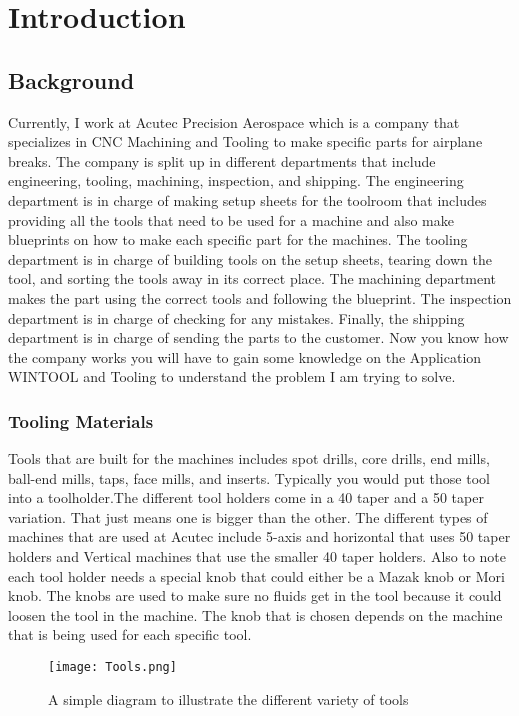 \chapter{Introduction}\label{sec:introduction}

\section{Background}

Currently, I work at Acutec Precision Aerospace which is a company that specializes in CNC Machining and Tooling to make specific parts for airplane breaks. The company is split up in different departments that include engineering, tooling, machining, inspection, and shipping. The engineering department is in charge of making setup sheets for the toolroom that includes providing all the tools that need to be used for a machine and also make blueprints on how to make each specific part for the machines. The tooling department is in charge of building tools on the setup sheets, tearing down the tool, and sorting the tools away in its correct place. The machining department makes the part using the correct tools and following the blueprint. The inspection department is in charge of checking for any mistakes. Finally, the shipping department is in charge of sending the parts to the customer. Now you know how the company works you will have to gain some knowledge on the Application WINTOOL and Tooling to understand the problem I am trying to solve.

\subsection{Tooling Materials}

Tools that are built for the machines includes spot drills, core drills, end mills, ball-end mills, taps, face mills, and inserts. Typically you would put those tool into a toolholder.The different tool holders come in a 40 taper and a 50 taper variation. That just means one is bigger than the other. The different types of machines that are used at Acutec include 5-axis and horizontal that uses 50 taper holders and Vertical machines that use the smaller 40 taper holders. Also to note each tool holder needs a special knob that could either be a Mazak knob or Mori knob. The knobs are used to make sure no fluids get in the tool because it could loosen the tool in the machine. The knob that is chosen depends on the machine that is being used for each specific tool.
\begin{figure}[htbp]
\centering
\texttt{[image: Tools.png]}
\caption{A simple diagram to illustrate the different variety of tools}
\label{latexprocess}
\end{figure}



